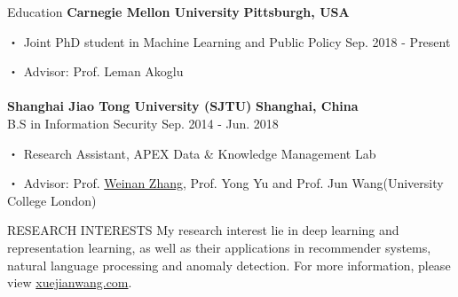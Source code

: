 \documentclass{resume} %
\begin{document}
\vspace{-1em}

\vspace{20pt}


\begin{rSection}{Education}
\textbf{Carnegie Mellon University} \hfill \textbf{Pittsburgh, USA}
\vspace{-5pt}
\item[・]Joint PhD student in Machine Learning and Public Policy \hfill Sep. 2018 - Present
\vspace{-5pt}
\item[・]Advisor: Prof. Leman Akoglu \\ \\
\textbf{Shanghai Jiao Tong University (SJTU)} \hfill \textbf{Shanghai, China}\\ %
B.S in Information Security \hfill Sep. 2014 - Jun. 2018
\vspace{-5pt}
\item[・] Research Assistant, APEX Data \& Knowledge Management Lab
\vspace{-5pt}
\item[・] Advisor: Prof. \href{http://wnzhang.net}{Weinan Zhang}, Prof. Yong Yu and Prof. Jun Wang(University College London)
\end{rSection}

\begin{rSection}{RESEARCH INTERESTS}
My research interest lie in deep learning and representation learning, as well as their applications in recommender systems, natural language processing and anomaly detection. For more information, please view \href{xuejianwang.com}{xuejianwang.com}.
\end{rSection}

\end{document}
